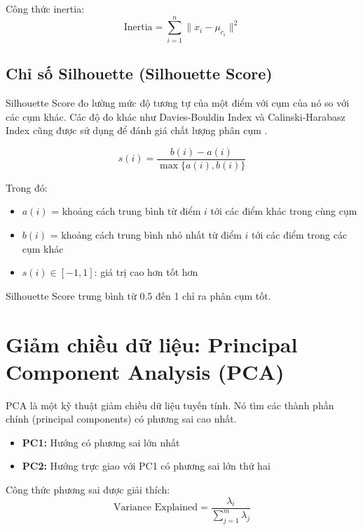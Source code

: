 Công thức inertia:
\begin{equation}
\text{Inertia} = \sum_{i=1}^{n} \|x_i - \mu_{c_i}\|^2
\end{equation}

\subsection{Chỉ số Silhouette (Silhouette Score)}

Silhouette Score \cite{silhouette_score} đo lường mức độ tương tự của một điểm với cụm của nó so với các cụm khác. Các độ đo khác như Davies-Bouldin Index \cite{davies_bouldin} và Calinski-Harabasz Index \cite{calinski_harabasz} cũng được sử dụng để đánh giá chất lượng phân cụm \cite{clustering_evaluation}.

\begin{equation}
s(i) = \frac{b(i) - a(i)}{\max\{a(i), b(i)\}}
\end{equation}

Trong đó:
\begin{itemize}
    \item $a(i)$ = khoảng cách trung bình từ điểm $i$ tới các điểm khác trong cùng cụm
    \item $b(i)$ = khoảng cách trung bình nhỏ nhất từ điểm $i$ tới các điểm trong các cụm khác
    \item $s(i) \in [-1, 1]$: giá trị cao hơn tốt hơn
\end{itemize}

Silhouette Score trung bình từ 0.5 đến 1 chỉ ra phân cụm tốt.

\section{Giảm chiều dữ liệu: Principal Component Analysis (PCA)}

PCA \cite{pca_paper} là một kỹ thuật giảm chiều dữ liệu tuyến tính. Nó tìm các thành phần chính (principal components) có phương sai cao nhất.

\begin{itemize}
    \item \textbf{PC1:} Hướng có phương sai lớn nhất
    \item \textbf{PC2:} Hướng trực giao với PC1 có phương sai lớn thứ hai
\end{itemize}

Công thức phương sai được giải thích:
\begin{equation}
\text{Variance Explained} = \frac{\lambda_i}{\sum_{j=1}^{m} \lambda_j}
\end{equation}

